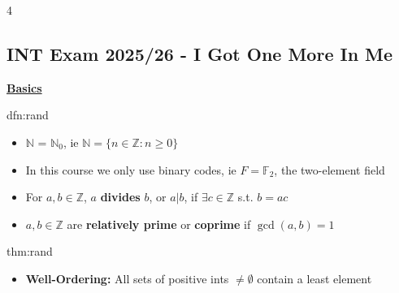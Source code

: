 \documentclass[landscape, 8pt]{extarticle}
\begin{document}
	
	\fontsize{5pt}{6pt} \selectfont
	
	\setlength\tabcolsep{4.5pt}
	\setlength\extrarowheight{2pt}
	
	\setlength{\abovedisplayskip}{0pt}
	\setlength{\belowdisplayskip}{0pt}
	\setlength{\abovedisplayshortskip}{0pt}
	\setlength{\belowdisplayshortskip}{0pt}
	
	\begin{multicols*}{4}
		\raggedcolumns 
		\vspace{-5pt}
		\subsection*{INT Exam 2025/26 - I Got One More In Me}
		\vspace{-5pt}
		
		
		
		
	{\footnotesize \textbf{\underline{Basics}}}
	
	
	
		\begin{dfn}{dfn:rand}{ }
			\begin{itemize}
				\item $\mathbb{N}$ = $\mathbb{N}_0$, ie $\mathbb{N} = \{n\in \mathbb{Z} : n \ge 0\}$
				\item In this course we only use binary codes, ie $F = \mathbb{F}_2$, the two-element field
				\item For $a, b\in \mathbb{Z}$, $a$ \textbf{divides} $b$, or $a|b$, if $\exists c\in \mathbb{Z}$ s.t. $b = ac$
				\item $a, b\in \mathbb{Z}$ are \textbf{relatively prime} or \textbf{coprime} if $\gcd(a, b) = 1$
			\end{itemize}
			
		\end{dfn}
		
		
		\begin{thm}{thm:rand}{ }
			\begin{itemize}
				\item \textbf{Well-Ordering:} All sets of positive ints $\ne \emptyset$ contain a least element
			\end{itemize}
			

\end{thm}
\end{multicols*}
\end{document}
